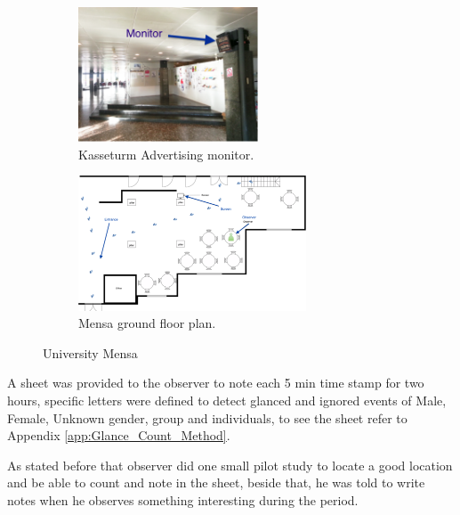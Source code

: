 

\begin{figure}[H]
\centering
    \begin{subfigure}[H]{0.45\textwidth}
        \centering
        \includegraphics[width=\textwidth,height=4cm]{Figures/3/Kasseturm_monitor}
        \caption{Kasseturm Advertising monitor.}
        \label{fig:kasseturm}
    \end{subfigure}
    \begin{subfigure}[H]{0.45\textwidth}
        \centering
        \includegraphics[width=\textwidth,height=4cm]{Figures/3/mensa_setup}
        \caption{Mensa ground floor plan.}
        \label{fig:mensasetup}
    \end{subfigure}
    \caption{University Mensa }
    \label{fig:observation_env}
\end{figure}


A sheet was provided to the observer to note each 5 min time stamp for two hours, specific letters were defined to detect glanced and ignored events of Male, Female, Unknown gender, group and individuals, to see the sheet refer to Appendix \ref{app:Glance_Count_Method}.

As stated before that observer did one small pilot study to locate a good location and be able to count and note in the sheet, beside that, he was told to write notes when he observes something interesting during the period.


